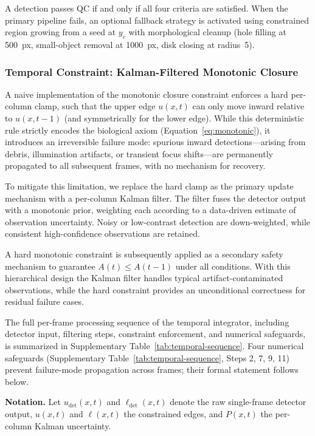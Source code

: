A detection passes QC if and only if all four criteria are satisfied.
When the primary pipeline fails, an optional fallback strategy is activated using constrained
region growing from a seed at $y_c$ with morphological cleanup
(hole filling at 500~px, small-object removal at 1000~px, disk closing at radius~5).

\subsubsection{Temporal Constraint: Kalman-Filtered Monotonic Closure}
\label{sec:temporal-constraint}

A naive implementation of the monotonic closure constraint enforces a hard per-column clamp, such that the upper edge $u(x,t)$ can only move inward relative to $u(x,t-1)$ (and symmetrically for the lower edge). While this deterministic rule strictly encodes the biological axiom (Equation~\ref{eq:monotonic}), it introduces an irreversible failure mode: spurious inward detections—arising from debris, illumination artifacts, or transient focus shifts—are permanently propagated to all subsequent frames, with no mechanism for recovery.

To mitigate this limitation, we replace the hard clamp as the primary update mechanism with a per-column Kalman filter. The filter fuses the detector output with a monotonic prior, weighting each according to a data-driven estimate of observation uncertainty. Noisy or low-contrast detection are down-weighted, while consistent high-confidence observations are retained. 

A hard monotonic constraint is subsequently applied as a secondary safety mechanism to guarantee $A(t) \leq A(t-1)$ under all conditions. With this hierarchical design the Kalman filter handles typical artifact-contaminated observations, while the hard constraint provides an unconditional correctness for residual failure cases. 

The full per-frame processing sequence of the temporal integrator, including detector input, filtering steps, constraint enforcement, and numerical safeguards, is summarized in Supplementary Table~\ref{tab:temporal-sequence}. Four numerical safeguards (Supplementary Table~\ref{tab:temporal-sequence}, Steps 2, 7, 9, 11) prevent failure-mode propagation across frames; their formal statement follows below.

\textbf{Notation.}
Let $u_\text{det}(x, t)$ and $\ell_\text{det}(x, t)$ denote the raw single-frame detector
output, $u(x, t)$ and $\ell(x, t)$ the constrained edges,
and $P(x, t)$ the per-column Kalman uncertainty.

